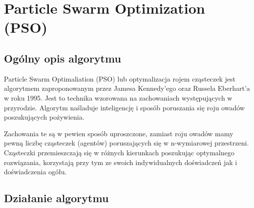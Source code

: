
\section{Particle Swarm Optimization (PSO)}
\author{Paweł Jastrzębski}
\subsection{Ogólny opis algorytmu}
\label{pso_description}
\par Particle Swarm Optimaliation (PSO) lub optymalizacja rojem cząsteczek jest algorytmem zaproponowanym przez Jamesa Kennedy'ego oraz Russela Eberhart'a w roku 1995. Jest to technika wzorowana na zachowaniach występujących w przyrodzie. Algorytm naśladuje inteligencję i sposób poruszania się roju owadów poszukujących pożywienia. 
\par Zachowania te są w pewien sposób uproszczone, zamiast roju owadów mamy pewną liczbę cząsteczek (agentów) poruszających się w n-wymiarowej przestrzeni. Cząsteczki przemieszczają się w różnych kierunkach poszukując optymalnego rozwiązania, korzystają przy tym ze swoich indywidualnych doświadczeń jak i doświadczenia ogółu.
\subsection{Działanie algorytmu}
